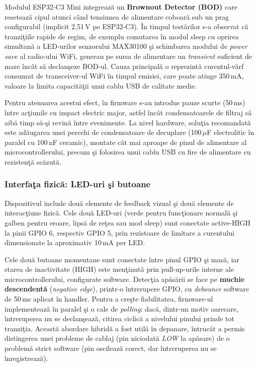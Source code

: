 \documentclass[12pt,a4paper]{article}
\begin{document}
Modulul ESP32-C3 Mini integrează un \textbf{Brownout Detector (BOD)} care resetează cipul atunci când tensiunea de alimentare coboară sub un prag configurabil (implicit 2{,}51\,V pe ESP32-C3). În timpul testărilor s-a observat că tranziţiile rapide de regim, de exemplu comutarea în modul sleep cu oprirea simultană a LED-urilor senzorului MAX30100 şi schimbarea modului de \textit{power save} al radio-ului WiFi, generau pe sursa de alimentare un \textit{transient} suficient de mare încât să declanşeze BOD-ul. Cauza principală o reprezintă curentul-vârf consumat de transceiver-ul WiFi în timpul emisiei, care poate atinge 350\,mA, valoare la limita capacităţii unui cablu USB de calitate medie.

Pentru atenuarea acestui efect, în firmware s-au introdus pauze scurte (50\,ms) între acţiunile cu impact electric major, astfel încât condensatoarele de filtraj să aibă timp să-şi revină între evenimente. La nivel hardware, soluţia recomandată este adăugarea unei perechi de condensatoare de decuplare (100\,$\mu$F electrolitic în paralel cu 100\,nF ceramic), montate cât mai aproape de pinul de alimentare al microcontrollerului, precum şi folosirea unui cablu USB cu fire de alimentare cu rezistenţă scăzută.

\subsubsection{Interfaţa fizică: LED-uri şi butoane}

Dispozitivul include două elemente de feedback vizual şi două elemente de interacţiune fizică. Cele două LED-uri (verde pentru funcţionare normală şi galben pentru eroare, lipsă de reţea sau mod sleep) sunt conectate active-HIGH la pinii GPIO 6, respectiv GPIO 5, prin rezistoare de limitare a curentului dimensionate la aproximativ 10\,mA per LED.

Cele două butoane momentane sunt conectate între pinul GPIO şi masă, iar starea de inactivitate (HIGH) este menţinută prin pull-up-urile interne ale microcontrollerului, configurate software. Detecţia apăsării se face pe \textbf{muchie descendentă} (\textit{negative edge}), printr-o întrerupere GPIO, cu \textit{debounce} software de 50\,ms aplicat în handler. Pentru a creşte fiabilitatea, firmware-ul implementează în paralel şi o cale de \textit{polling}: dacă, dintr-un motiv oarecare, întreruperea nu se declanşează, citirea ciclică a nivelului pinului prinde tot tranziţia. Această abordare hibridă a fost utilă în depanare, întrucât a permis distingerea unei probleme de cablaj (pin niciodată \textit{LOW} la apăsare) de o problemă strict software (pin oscilează corect, dar întreruperea nu se înregistrează).
\end{document}
